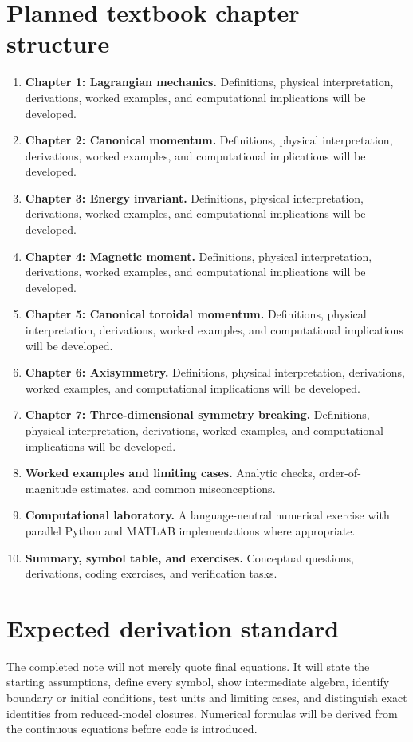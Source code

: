 \documentclass[11pt]{article}
\begin{document}
\section{Planned textbook chapter structure}
\begin{enumerate}[leftmargin=1.8em]
\item \textbf{Chapter 1: Lagrangian mechanics.} Definitions, physical interpretation, derivations, worked examples, and computational implications will be developed.
\item \textbf{Chapter 2: Canonical momentum.} Definitions, physical interpretation, derivations, worked examples, and computational implications will be developed.
\item \textbf{Chapter 3: Energy invariant.} Definitions, physical interpretation, derivations, worked examples, and computational implications will be developed.
\item \textbf{Chapter 4: Magnetic moment.} Definitions, physical interpretation, derivations, worked examples, and computational implications will be developed.
\item \textbf{Chapter 5: Canonical toroidal momentum.} Definitions, physical interpretation, derivations, worked examples, and computational implications will be developed.
\item \textbf{Chapter 6: Axisymmetry.} Definitions, physical interpretation, derivations, worked examples, and computational implications will be developed.
\item \textbf{Chapter 7: Three-dimensional symmetry breaking.} Definitions, physical interpretation, derivations, worked examples, and computational implications will be developed.
\item \textbf{Worked examples and limiting cases.} Analytic checks, order-of-magnitude estimates, and common misconceptions.
\item \textbf{Computational laboratory.} A language-neutral numerical exercise with parallel Python and MATLAB implementations where appropriate.
\item \textbf{Summary, symbol table, and exercises.} Conceptual questions, derivations, coding exercises, and verification tasks.
\end{enumerate}

\section{Expected derivation standard}
The completed note will not merely quote final equations. It will state the starting assumptions, define every symbol, show intermediate algebra, identify boundary or initial conditions, test units and limiting cases, and distinguish exact identities from reduced-model closures. Numerical formulas will be derived from the continuous equations before code is introduced.
\end{document}
